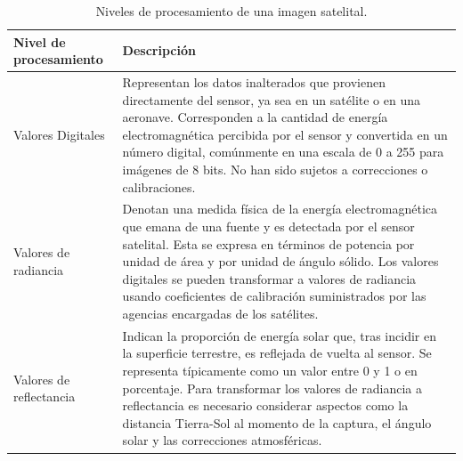\begin{table}[H]
    \caption{Niveles de procesamiento de una imagen satelital.}
    \begin{tabularx}{1\textwidth}{p{4cm}X}
        \hline
        \textbf{Nivel de  \newline procesamiento} & \textbf{Descripción}                                                                                                                                                                                                                                                                                                                                                                          \\
        \hline
        Valores Digitales                         & Representan los datos inalterados que provienen directamente del sensor, ya sea en un satélite o en una aeronave. Corresponden a la cantidad de energía electromagnética percibida por el sensor y convertida en un número digital, comúnmente en una escala de 0 a 255 para imágenes de 8 bits. No han sido sujetos a correcciones o calibraciones.                                          \\
        \hline
        Valores de radiancia                      & Denotan una medida física de la energía electromagnética que emana de una fuente y es detectada por el sensor satelital. Esta se expresa en términos de potencia por unidad de área y por unidad de ángulo sólido. Los valores digitales se pueden transformar a valores de radiancia usando coeficientes de calibración suministrados por las agencias encargadas de los satélites.          \\
        \hline
        Valores de reflectancia                   & Indican la proporción de energía solar que, tras incidir en la superficie terrestre, es reflejada de vuelta al sensor. Se representa típicamente como un valor entre 0 y 1 o en porcentaje. Para transformar los valores de radiancia a reflectancia es necesario considerar aspectos como la distancia Tierra-Sol al momento de la captura, el ángulo solar y las correcciones atmosféricas. \\
        \hline
    \end{tabularx}
    \begin{minipage}{\textwidth}
        \vspace{10pt}
        \label{tab:NivelProcesamientoImagenSatelital}
    \end{minipage}
\end{table}

